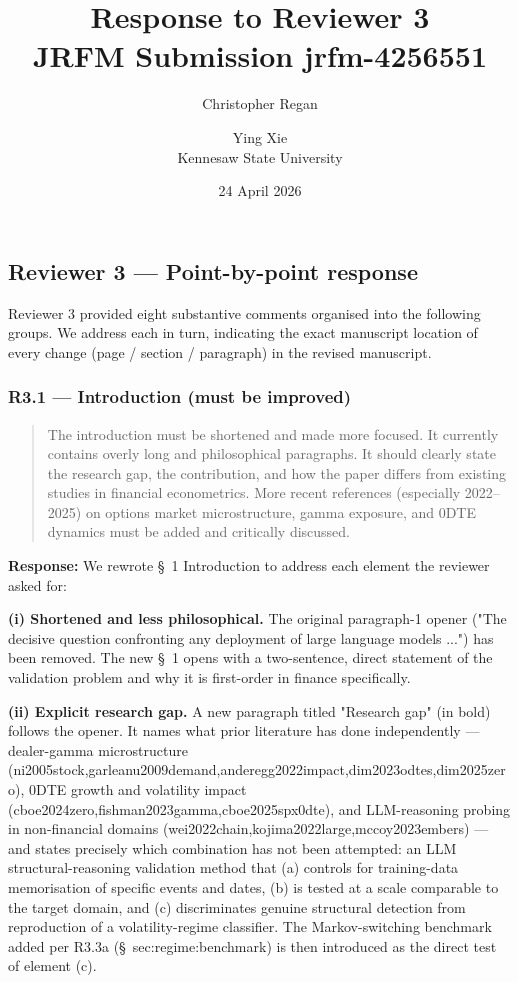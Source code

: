 \documentclass[11pt,a4paper]{article}
\title{Response to Reviewer 3 \\ \large JRFM Submission jrfm-4256551}
\author{Christopher Regan \and Ying Xie \\ Kennesaw State University}
\date{24 April 2026}
\begin{document}
\maketitle
\subsection*{Reviewer 3 --- Point-by-point response}

Reviewer 3 provided eight substantive comments organised into the following
groups. We address each in turn, indicating the exact manuscript location of
every change (page / section / paragraph) in the revised manuscript.

\subsubsection*{R3.1 --- Introduction (must be improved)}

\begin{quote}
The introduction must be shortened and made more focused. It currently contains overly long and philosophical paragraphs. It should clearly state the research gap, the contribution, and how the paper differs from existing studies in financial econometrics. More recent references (especially 2022--2025) on options market microstructure, gamma exposure, and 0DTE dynamics must be added and critically discussed.
\end{quote}

\textbf{Response:} We rewrote \S{}~1 Introduction to address each element the
reviewer asked for:

\textbf{(i) Shortened and less philosophical.} The original paragraph-1
opener ("The decisive question confronting any deployment of large
language models ...") has been removed. The new \S{}~1 opens with a
two-sentence, direct statement of the validation problem and why it
is first-order in finance specifically.

\textbf{(ii) Explicit research gap.} A new paragraph titled "Research gap"
(in bold) follows the opener. It names what prior literature has done
independently --- dealer-gamma microstructure
(ni2005stock,garleanu2009demand,anderegg2022impact,dim2023odtes,dim2025zero),
0DTE growth and volatility impact
(cboe2024zero,fishman2023gamma,cboe2025spx0dte), and LLM-reasoning
probing in non-financial domains
(wei2022chain,kojima2022large,mccoy2023embers) --- and states
precisely which combination has not been attempted: an LLM
structural-reasoning validation method that (a) controls for
training-data memorisation of specific events and dates, (b) is tested
at a scale comparable to the target domain, and (c) discriminates
genuine structural detection from reproduction of a volatility-regime
classifier. The Markov-switching benchmark added per R3.3a
(\S{}~sec:regime:benchmark) is then introduced as the direct test of
element (c).
\end{document}
